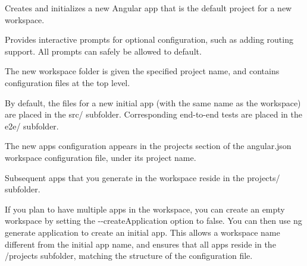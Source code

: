 Creates and initializes a new Angular app that is the default project for a new workspace.

Provides interactive prompts for optional configuration, such as adding routing support. All prompts can safely be allowed to default.


\begin{DoxyItemize}
\item The new workspace folder is given the specified project name, and contains configuration files at the top level.
\item By default, the files for a new initial app (with the same name as the workspace) are placed in the {\ttfamily src/} subfolder. Corresponding end-\/to-\/end tests are placed in the {\ttfamily e2e/} subfolder.
\item The new app\textquotesingle{}s configuration appears in the {\ttfamily projects} section of the {\ttfamily angular.\+json} workspace configuration file, under its project name.
\item Subsequent apps that you generate in the workspace reside in the {\ttfamily projects/} subfolder.
\end{DoxyItemize}

If you plan to have multiple apps in the workspace, you can create an empty workspace by setting the {\ttfamily -\/-\/create\+Application} option to false. You can then use {\ttfamily ng generate application} to create an initial app. This allows a workspace name different from the initial app name, and ensures that all apps reside in the {\ttfamily /projects} subfolder, matching the structure of the configuration file. 